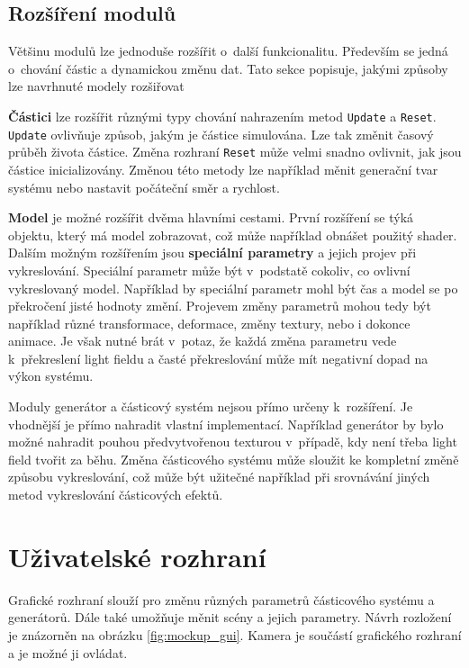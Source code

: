 \subsection{Rozšíření modulů}
Většinu modulů lze jednoduše rozšířit o~další funkcionalitu. Především se jedná o~chování částic a dynamickou změnu dat. Tato sekce popisuje, jakými způsoby lze navrhnuté modely rozšiřovat 

\textbf{Částici} lze rozšířit různými typy chování nahrazením metod \texttt{Update} a \texttt{Reset}. \texttt{Update} ovlivňuje způsob, jakým je částice simulována. Lze tak změnit časový průběh života částice. Změna rozhraní \texttt{Reset} může velmi snadno ovlivnit, jak jsou částice inicializovány. Změnou této metody lze například měnit generační tvar systému nebo nastavit počáteční směr a rychlost.

\textbf{Model} je možné rozšířit dvěma hlavními cestami. První rozšíření se týká objektu, který má model zobrazovat, což může například obnášet použitý shader. Dalším možným rozšířením jsou \textbf{speciální parametry} a jejich projev při vykreslování. Speciální parametr může být v~podstatě cokoliv, co ovlivní vykreslovaný model. Například by speciální parametr mohl být čas a model se po překročení jisté hodnoty změní. Projevem změny parametrů mohou tedy  být například různé transformace, deformace, změny textury, nebo i dokonce animace. Je však nutné brát v~potaz, že každá změna parametru vede k~překreslení light fieldu a časté překreslování může mít negativní dopad na výkon systému. 

Moduly generátor a částicový systém nejsou přímo určeny k~rozšíření. Je vhodnější je přímo nahradit vlastní implementací. Například generátor by bylo možné nahradit pouhou předvytvořenou texturou v~případě, kdy není třeba light field tvořit za běhu. Změna částicového systému může sloužit ke kompletní změně způsobu vykreslování, což může být užitečné například při srovnávání jiných metod vykreslování částicových efektů.

\section{Uživatelské rozhraní}
Grafické rozhraní slouží pro změnu různých parametrů částicového systému a generátorů. Dále také umožňuje měnit scény a jejich parametry. Návrh rozložení je znázorněn na obrázku \ref{fig:mockup_gui}. Kamera je součástí grafického rozhraní a je možné ji ovládat.

